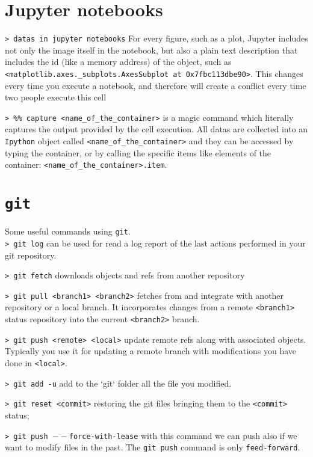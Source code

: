 \documentclass[11pt]{article}
\newcommand{\cmd}[1]{\colorbox{light-gray}{\textcolor{gio}{\texttt{#1}}}}
\begin{document}
\begin{multicols}{2}
\section{Jupyter notebooks}

\cmd{> datas in jupyter notebooks} For every figure, such as a plot, Jupyter 
includes not only the image itself in the notebook, but also a plain text description 
that includes the id (like a memory address) of the object, such as 
\texttt{<matplotlib.axes.\_subplots.AxesSubplot at 0x7fbc113dbe90>}. 
This changes every time you execute a notebook, and therefore will create a 
conflict every time two people execute this cell

\cmd{> \%\% capture <name\_of\_the\_container>} is a magic command which literally 
captures the output provided by the cell execution. All datas are collected into 
an \texttt{Ipython} object called \texttt{<name\_of\_the\_container>} and they 
can be accessed by typing the container, or by calling the specific items like
 elements of the container: \texttt{<name\_of\_the\_container>.item}. 


\section{\texttt{git}}

Some useful commands using \texttt{git}. \\

\cmd{> git log} can be used for read a log report of the last actions performed
in your git repository.

\cmd{> git fetch} downloads objects and refs from another repository

\cmd{> git pull <branch1> <branch2>} fetches from and integrate with another 
repository or a local branch. It incorporates changes from a remote \texttt{<branch1>} 
status repository into the current \texttt{<branch2>} branch.

\cmd{> git push <remote> <local>} update remote refs along with associated objects. 
Typically you use it for updating a remote branch with modifications you have done 
in \texttt{<local>}.

\cmd{> git add -u} add to the `git` folder all the file you modified.

\cmd{> git reset <commit>} restoring the git files bringing them to the 
\texttt{<commit>} status;

\cmd{> git push $--$force-with-lease} with this command we can push also if we 
want to modify files in the past. The \texttt{git push} command is only \texttt{feed-forward}.


\end{multicols}
\end{document}
